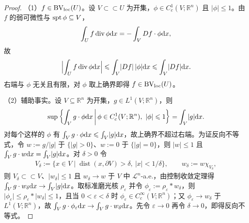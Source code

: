 \documentclass[../../main.tex]{subfiles}%
\begin{document}
\begin{proof}
（1）$f\in\mathrm{BV}_{\mathrm{loc}}(U)$。设 $V\subset\subset U$ 为开集，$\phi\in C_c^1(V;\mathbb{R}^n)$ 且 $\lvert\phi\rvert\leqslant1$。由 $f$ 的弱可微性与 $\operatorname{spt}\phi\subseteq V$，
\begin{align*}
\int_U f\operatorname{div}\phi\mathrm{d} x=-\int_V Df\cdot\phi\mathrm{d} x,
\end{align*}
故
\begin{align*}
\Bigl\lvert\int_U f\operatorname{div}\phi\mathrm{d} x\Bigr\rvert\leqslant\int_V\lvert Df\rvert\,\lvert\phi\rvert\mathrm{d} x\leqslant\int_V\lvert Df\rvert\mathrm{d} x .
\end{align*}
右端与 $\phi$ 无关且有限，对 $\phi$ 取上确界即得 $f\in\mathrm{BV}_{\mathrm{loc}}(U)$。

（2）辅助事实。设 $V\subseteq\mathbb{R}^n$ 为开集，$g\in L^1(V;\mathbb{R}^n)$，则
\begin{align*}
\sup\left\{\int_V g\cdot\phi\mathrm{d} x\,\middle|\,\phi\in C_c^1(V;\mathbb{R}^n),\ \lvert\phi\rvert\leqslant1\right\}=\int_V\lvert g\rvert\mathrm{d} x .
\end{align*}
对每个这样的 $\phi$ 有 $\int_V g\cdot\phi\mathrm{d} x\leqslant\int_V\lvert g\rvert\mathrm{d} x$，故上确界不超过右端。为证反向不等式，令 $w:=g/\lvert g\rvert$ 于 $\{\lvert g\rvert>0\}$、$w:=0$ 于 $\{\lvert g\rvert=0\}$，则 $\lvert w\rvert\leqslant1$ 且 $\int_V g\cdot w\mathrm{d} x=\int_V\lvert g\rvert\mathrm{d} x$。对 $\delta>0$ 令
\begin{align*}
V_\delta:=\{x\in V\mid\operatorname{dist}(x,\partial V)>\delta,\ \lvert x\rvert<1/\delta\},\qquad w_\delta:=w\chi_{V_\delta},
\end{align*}
则 $V_\delta\subset\subset V$、$\lvert w_\delta\rvert\leqslant1$ 且 $w_\delta\to w$ 于 $V$ 中 $\mathcal{L}^n$-a.e.，由控制收敛定理得 $\int_V g\cdot w_\delta\mathrm{d} x\to\int_V\lvert g\rvert\mathrm{d} x$。取标准磨光核 $\rho_\varepsilon$ 并令 $\phi_\varepsilon:=\rho_\varepsilon*w_\delta$，则 $\lvert\phi_\varepsilon\rvert\leqslant\rho_\varepsilon*\lvert w_\delta\rvert\leqslant1$，且当 $0<\varepsilon<\delta$ 时 $\phi_\varepsilon\in C_c^{\infty}(V;\mathbb{R}^n)$；又 $\phi_\varepsilon\to w_\delta$ 于 $L^1(V;\mathbb{R}^n)$，故 $\int_V g\cdot\phi_\varepsilon\mathrm{d} x\to\int_V g\cdot w_\delta\mathrm{d} x$。先令 $\varepsilon\to0$ 再令 $\delta\to0$，即得反向不等式。


\end{proof}
\end{document}

